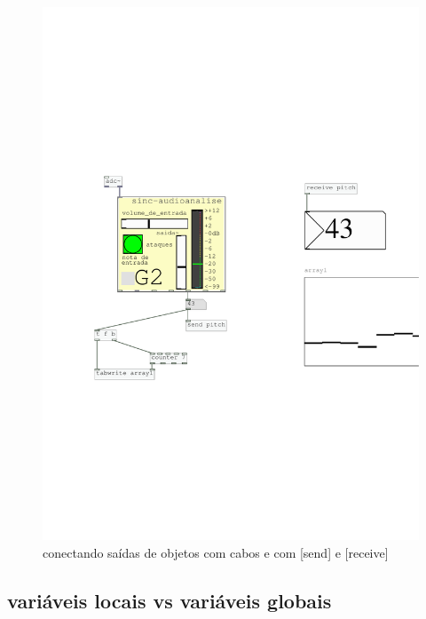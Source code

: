 \documentclass{ppgmus}
\begin{document}
\begin{figure}[!htt]
\includegraphics[scale=.6]{ex-conexoes}
\caption{conectando saídas de objetos com cabos e com [send] e [receive]}
\label{ex-conexoes}
\end{figure}



\subsection{variáveis locais vs variáveis globais}
\end{document}
